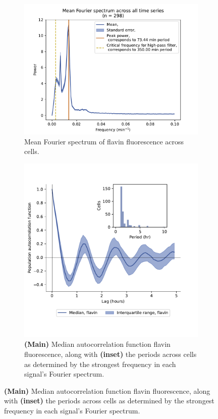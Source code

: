 \begin{figure}
  \centering
  \begin{subfigure}[htpb]{0.4\textwidth}
   \centering
   \includegraphics[width=\textwidth]{by4741_491_13}
   \caption{
    Mean Fourier spectrum of flavin fluorescence across cells.
   }
   \label{fig:biology-by4741-sync-fourier}
  \end{subfigure}%
  \begin{subfigure}[htpb]{0.4\textwidth}
   \centering
   \includegraphics[width=\textwidth]{by4741_491_12}
   \caption{
     \textbf{(Main)} Median autocorrelation function flavin fluorescence,
     along with \textbf{(inset)} the periods across cells as determined by the strongest frequency in each signal's Fourier spectrum.
   }
   \label{fig:biology-by4741-sync-acf}
  \end{subfigure}


\end{figure}
